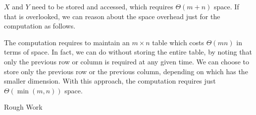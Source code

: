\documentclass[addpoints,a4paper]{exam}
\begin{document}
\begin{questions}
\begin{parts}
\begin{solution}
      $X$ and $Y$ need to be stored and accessed, which requires $\Theta(m+n)$ space. If that is overlooked, we can reason about the space overhead just for the computation as follows.

      The computation requires to maintain an $m\times n$ table which costs $\Theta(mn)$ in terms of space. In fact, we can do without storing the entire table, by noting that only the previous row or column is required at any given time. We can choose to store only the previous row or the previous column, depending on which has the smaller dimension. With this approach, the computation requires just $\Theta(\min(m,n))$ space.
    \end{solution}
  \end{parts}
\end{questions}

\newpage
\centerline{\large Rough Work}
\end{document}
